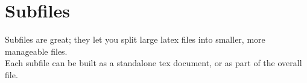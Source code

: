 \documentclass[../longformnotes.tex]{subfiles}
\begin{document}
\section{Subfiles}
Subfiles are great; they let you split large latex files into smaller, more manageable files. \\


Each subfile can be built as a standalone tex document, or as part of the overall file. 
\end{document}
